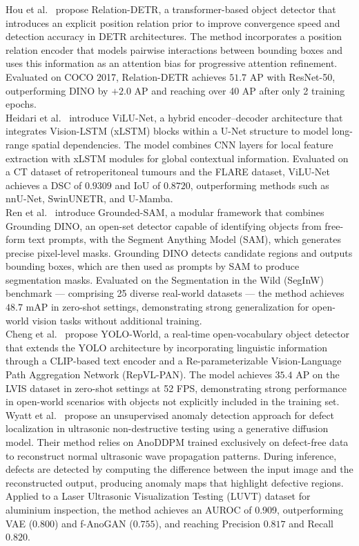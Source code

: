 \documentclass[11pt]{article}
\begin{document}
Hou et al.~\cite{HouRelationDETR2024} propose Relation-DETR, a transformer-based
object detector that introduces an explicit position relation prior to improve
convergence speed and detection accuracy in DETR architectures. The method
incorporates a position relation encoder that models pairwise interactions between
bounding boxes and uses this information as an attention bias for progressive
attention refinement. Evaluated on COCO 2017, Relation-DETR achieves $51.7$ AP
with ResNet-50, outperforming DINO by $+2.0$ AP and reaching over 40 AP after
only 2 training epochs.\\

Heidari et al.~\cite{HeidariViLUNet2025} introduce ViLU-Net, a hybrid
encoder--decoder architecture that integrates Vision-LSTM (xLSTM) blocks within
a U-Net structure to model long-range spatial dependencies. The model combines CNN
layers for local feature extraction with xLSTM modules for global contextual
information. Evaluated on a CT dataset of retroperitoneal tumours and the FLARE
dataset, ViLU-Net achieves a DSC of $0.9309$ and IoU of $0.8720$, outperforming
methods such as nnU-Net, SwinUNETR, and U-Mamba.\\

Ren et al.~\cite{RenGroundedSAM2024} introduce Grounded-SAM, a modular framework
that combines Grounding DINO, an open-set detector capable of identifying objects
from free-form text prompts, with the Segment Anything Model (SAM), which
generates precise pixel-level masks. Grounding DINO detects candidate regions and
outputs bounding boxes, which are then used as prompts by SAM to produce
segmentation masks. Evaluated on the Segmentation in the Wild (SegInW) benchmark
--- comprising 25 diverse real-world datasets --- the method achieves $48.7$ mAP
in zero-shot settings, demonstrating strong generalization for open-world vision
tasks without additional training.\\

Cheng et al.~\cite{ChengYOLOWorld2024} propose YOLO-World, a real-time
open-vocabulary object detector that extends the YOLO architecture by
incorporating linguistic information through a CLIP-based text encoder and a
Re-parameterizable Vision-Language Path Aggregation Network (RepVL-PAN). The
model achieves $35.4$ AP on the LVIS dataset in zero-shot settings at 52 FPS,
demonstrating strong performance in open-world scenarios with objects not
explicitly included in the training set.\\

Wyatt et al.~\cite{WyattAnoDDPM2022} propose an unsupervised anomaly detection
approach for defect localization in ultrasonic non-destructive testing using a
generative diffusion model. Their method relies on AnoDDPM trained exclusively
on defect-free data to reconstruct normal ultrasonic wave propagation patterns.
During inference, defects are detected by computing the difference between the
input image and the reconstructed output, producing anomaly maps that highlight
defective regions. Applied to a Laser Ultrasonic Visualization Testing (LUVT)
dataset for aluminium inspection, the method achieves an AUROC of 0.909,
outperforming VAE ($0.800$) and f-AnoGAN ($0.755$), and reaching Precision
$0.817$ and Recall $0.820$.\\
\end{document}

